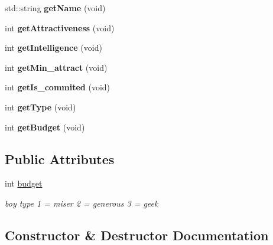 \begin{DoxyCompactItemize}
std\+::string {\bfseries get\+Name} (void)
\item 
\mbox{\label{classboy_a49ba309bc8a901988aec23a9485fe9b8}} 
int {\bfseries get\+Attractiveness} (void)
\item 
\mbox{\label{classboy_a7e97d2b18e6e788d3665f89c5c324a4c}} 
int {\bfseries get\+Intelligence} (void)
\item 
\mbox{\label{classboy_a1127d720a42a8b99e8b8b5232a01888b}} 
int {\bfseries get\+Min\+\_\+attract} (void)
\item 
\mbox{\label{classboy_adfc4e65cda02ff33a0fdf3809f808c6d}} 
int {\bfseries get\+Is\+\_\+commited} (void)
\item 
\mbox{\label{classboy_a4449dd8bd85b8fb071624c00843d4879}} 
int {\bfseries get\+Type} (void)
\item 
\mbox{\label{classboy_afcc38a4a00dcb96193565acce288b170}} 
int {\bfseries get\+Budget} (void)
\end{DoxyCompactItemize}
\subsection*{Public Attributes}
\begin{DoxyCompactItemize}
\item 
\mbox{\label{classboy_a80d6bd6642a612cf0428ab56a2098316}} 
int \hyperlink{classboy_a80d6bd6642a612cf0428ab56a2098316}{budget}
\begin{DoxyCompactList}\small\item\em boy type \textquotesingle{}1\textquotesingle{} = miser \textquotesingle{}2\textquotesingle{} = generous \textquotesingle{}3\textquotesingle{} = geek \end{DoxyCompactList}\end{DoxyCompactItemize}


\subsection{Constructor \& Destructor Documentation}
\mbox{\label{classboy_aeda8572de2e02a1707c2ca5cf1e5fadb}} 
